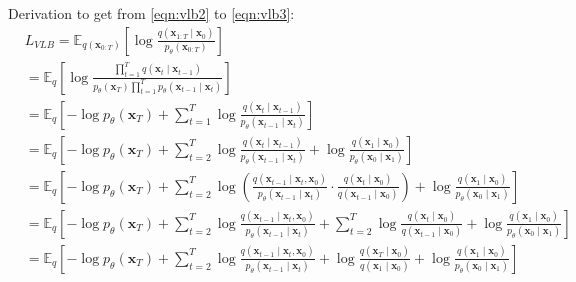 Derivation to get from \autoref{eqn:vlb2} to \autoref{eqn:vlb3}:
\begingroup
\small
\begin{subequations}
	\label{eqn:vlb3_appendix}
	\begin{align}
	& L_{VLB}=\mathbb{E}_{q\left(\mathbf{x}_{0: T}\right)}\left[\log \frac{q\left(\mathbf{x}_{1: T} \mid \mathbf{x}_0\right)}{p_\theta\left(\mathbf{x}_{0: T}\right)}\right] \\
	& =\mathbb{E}_q\left[\log \frac{\prod_{t=1}^T q\left(\mathbf{x}_t \mid \mathbf{x}_{t-1}\right)}{p_\theta\left(\mathbf{x}_T\right) \prod_{t=1}^T p_\theta\left(\mathbf{x}_{t-1} \mid \mathbf{x}_t\right)}\right] \\
	& =\mathbb{E}_q\left[-\log p_\theta\left(\mathbf{x}_T\right)+\sum_{t=1}^T \log \frac{q\left(\mathbf{x}_t \mid \mathbf{x}_{t-1}\right)}{p_\theta\left(\mathbf{x}_{t-1} \mid \mathbf{x}_t\right)}\right] \\
	& =\mathbb{E}_q\left[-\log p_\theta\left(\mathbf{x}_T\right)+\sum_{t=2}^T \log \frac{q\left(\mathbf{x}_t \mid \mathbf{x}_{t-1}\right)}{p_\theta\left(\mathbf{x}_{t-1} \mid \mathbf{x}_t\right)}+\log \frac{q\left(\mathbf{x}_1 \mid \mathbf{x}_0\right)}{p_\theta\left(\mathbf{x}_0 \mid \mathbf{x}_1\right)}\right] \\
	& =\mathbb{E}_q\left[-\log p_\theta\left(\mathbf{x}_T\right)+\sum_{t=2}^T \log \left(\frac{q\left(\mathbf{x}_{t-1} \mid \mathbf{x}_t, \mathbf{x}_0\right)}{p_\theta\left(\mathbf{x}_{t-1} \mid \mathbf{x}_t\right)} \cdot \frac{q\left(\mathbf{x}_t \mid \mathbf{x}_0\right)}{q\left(\mathbf{x}_{t-1} \mid \mathbf{x}_0\right)}\right)+\log \frac{q\left(\mathbf{x}_1 \mid \mathbf{x}_0\right)}{p_\theta\left(\mathbf{x}_0 \mid \mathbf{x}_1\right)}\right] \\
	& =\mathbb{E}_q\left[-\log p_\theta\left(\mathbf{x}_T\right)+\sum_{t=2}^T \log \frac{q\left(\mathbf{x}_{t-1} \mid \mathbf{x}_t, \mathbf{x}_0\right)}{p_\theta\left(\mathbf{x}_{t-1} \mid \mathbf{x}_t\right)}+\sum_{t=2}^T \log \frac{q\left(\mathbf{x}_t \mid \mathbf{x}_0\right)}{q\left(\mathbf{x}_{t-1} \mid \mathbf{x}_0\right)}+\log \frac{q\left(\mathbf{x}_1 \mid \mathbf{x}_0\right)}{p_\theta\left(\mathbf{x}_0 \mid \mathbf{x}_1\right)}\right] \\
	& =\mathbb{E}_q\left[-\log p_\theta\left(\mathbf{x}_T\right)+\sum_{t=2}^T \log \frac{q\left(\mathbf{x}_{t-1} \mid \mathbf{x}_t, \mathbf{x}_0\right)}{p_\theta\left(\mathbf{x}_{t-1} \mid \mathbf{x}_t\right)}+\log \frac{q\left(\mathbf{x}_T \mid \mathbf{x}_0\right)}{q\left(\mathbf{x}_1 \mid \mathbf{x}_0\right)}+\log \frac{q\left(\mathbf{x}_1 \mid \mathbf{x}_0\right)}{p_\theta\left(\mathbf{x}_0 \mid \mathbf{x}_1\right)}\right] \\

\end{align}
\end{subequations}
